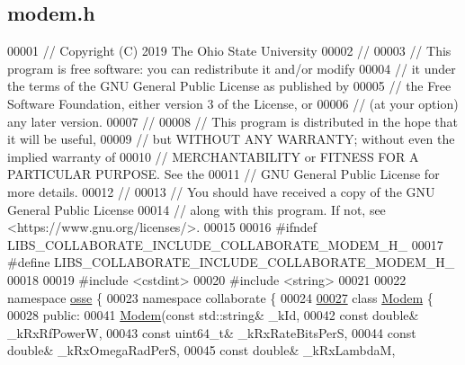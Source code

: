 \hypertarget{modem_8h_source}{}\subsection{modem.\+h}
\label{modem_8h_source}

\begin{DoxyCode}
00001 \textcolor{comment}{// Copyright (C) 2019 The Ohio State University}
00002 \textcolor{comment}{//}
00003 \textcolor{comment}{// This program is free software: you can redistribute it and/or modify}
00004 \textcolor{comment}{// it under the terms of the GNU General Public License as published by}
00005 \textcolor{comment}{// the Free Software Foundation, either version 3 of the License, or}
00006 \textcolor{comment}{// (at your option) any later version.}
00007 \textcolor{comment}{//}
00008 \textcolor{comment}{// This program is distributed in the hope that it will be useful,}
00009 \textcolor{comment}{// but WITHOUT ANY WARRANTY; without even the implied warranty of}
00010 \textcolor{comment}{// MERCHANTABILITY or FITNESS FOR A PARTICULAR PURPOSE.  See the}
00011 \textcolor{comment}{// GNU General Public License for more details.}
00012 \textcolor{comment}{//}
00013 \textcolor{comment}{// You should have received a copy of the GNU General Public License}
00014 \textcolor{comment}{// along with this program.  If not, see <https://www.gnu.org/licenses/>.}
00015 
00016 \textcolor{preprocessor}{#ifndef LIBS\_COLLABORATE\_INCLUDE\_COLLABORATE\_MODEM\_H\_}
00017 \textcolor{preprocessor}{#define LIBS\_COLLABORATE\_INCLUDE\_COLLABORATE\_MODEM\_H\_}
00018 
00019 \textcolor{preprocessor}{#include <cstdint>}
00020 \textcolor{preprocessor}{#include <string>}
00021 
00022 \textcolor{keyword}{namespace }\hyperlink{namespaceosse}{osse} \{
00023 \textcolor{keyword}{namespace }collaborate \{
00024 
\hyperlink{classosse_1_1collaborate_1_1_modem}{00027} \textcolor{keyword}{class }\hyperlink{classosse_1_1collaborate_1_1_modem}{Modem} \{
00028  \textcolor{keyword}{public}:
00041   \hyperlink{classosse_1_1collaborate_1_1_modem_ade030a147d5bc9aaf4a0b615c1cea84a}{Modem}(\textcolor{keyword}{const} std::string& \_kId,
00042         \textcolor{keyword}{const} \textcolor{keywordtype}{double}& \_kRxRfPowerW,
00043         \textcolor{keyword}{const} uint64\_t& \_kRxRateBitsPerS,
00044         \textcolor{keyword}{const} \textcolor{keywordtype}{double}& \_kRxOmegaRadPerS,
00045         \textcolor{keyword}{const} \textcolor{keywordtype}{double}& \_kRxLambdaM,

\end{DoxyCode}
